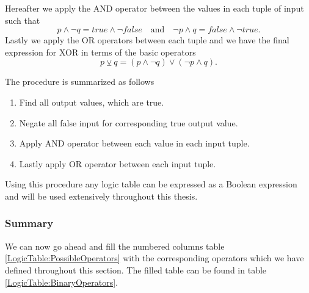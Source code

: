                 Hereafter we apply the AND operator between the values in each tuple of input such that
                \begin{equation}
                    p \wedge \neg q = true \wedge \neg false \quad \text{and} \quad \neg p \wedge q = false \wedge \neg true.
                \end{equation}
                Lastly we apply the OR operators between each tuple and we have the final expression for XOR in terms of the basic operators
                \begin{equation}
                    p \veebar q = (p \wedge \neg q) \vee (\neg p \wedge q).
                \end{equation}
                
                The procedure is summarized as follows
                \begin{enumerate}
                    \item Find all output values, which are true.
                    \item Negate all false input for corresponding true output value.
                    \item Apply AND operator between each value in each input tuple.
                    \item Lastly apply OR operator between each input tuple.
                \end{enumerate}
                Using this procedure any logic table can be expressed as a Boolean expression and will be used extensively throughout this thesis.
                
                
            \subsubsection{Summary}
                We can now go ahead and fill the numbered columns table \ref{LogicTable:PossibleOperators} with the corresponding operators which we have defined throughout this section. The filled table can be found in table \ref{LogicTable:BinaryOperators}. 
                
